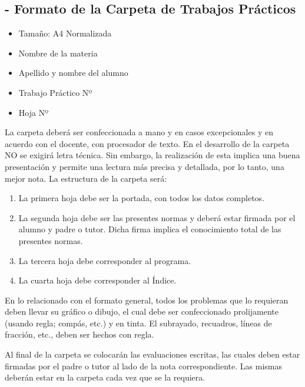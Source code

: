 \documentclass[../main]{subfiles}
\begin{document}
 

\subsection{- Formato de la Carpeta de Trabajos Prácticos }

\begin{itemize}
    
\item Tamaño: A4 Normalizada 

\item Nombre de la materia 

\item Apellido y nombre del alumno 

\item Trabajo Práctico Nº  

\item Hoja Nº 

\end{itemize}
La carpeta deberá ser confeccionada a mano y en casos excepcionales y en acuerdo con el docente, con procesador de texto. En el desarrollo de la carpeta NO se exigirá letra técnica. Sin embargo, la realización de esta implica una buena presentación y permite una lectura más precisa y detallada, por lo tanto, una mejor nota. La estructura de la carpeta será: 
\begin{enumerate}
    
\item La primera hoja debe ser la portada, con todos los datos completos. 

\item La segunda hoja debe ser las presentes normas y deberá estar firmada por el alumno y padre o tutor. Dicha firma implica el conocimiento total de las presentes normas. 

\item La tercera hoja debe corresponder al programa. 

\item La cuarta hoja debe corresponder al Índice.  

\end{enumerate}
En lo relacionado con el formato general, todos los problemas que lo requieran deben llevar su gráfico o dibujo, el cual debe ser confeccionado prolijamente (usando regla; compás, etc.) y en tinta. El subrayado, recuadros, líneas de fracción, etc., deben ser hechos con regla. 

Al final de la carpeta se colocarán las evaluaciones escritas, las cuales deben estar firmadas por el padre o tutor al lado de la nota correspondiente. Las mismas deberán estar en la carpeta cada vez que se la requiera. 
\end{document}
